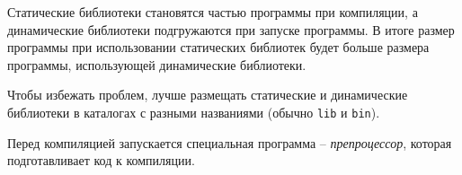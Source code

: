 \documentclass[%
	11pt,
	a4paper,
	utf8,
		]{article}
\begin{document}
Статические библиотеки становятся частью программы при компиляции, а динамические библиотеки подгружаются при запуске программы. В итоге размер программы при использовании статических библиотек будет больше размера программы, использующей динамические библиотеки.

Чтобы избежать проблем, лучше размещать статические и динамические библиотеки в каталогах с разными названиями (обычно \verb|lib| и \verb|bin|).

Перед компиляцией запускается специальная программа -- \emph{препроцессор}, которая подготавливает код к компиляции.







\begin{thebibliography}{99}
	
	
	
\end{thebibliography}


\lstlistoflistings{}
\end{document}
